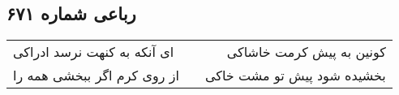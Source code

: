 \begin{center}
\section*{رباعی شماره ۶۷۱}
\label{sec:sh671}
\begin{longtable}{l p{0.5cm} r}
ای آنکه به کنهت نرسد ادراکی
&&
کونین به پیش کرمت خاشاکی
\\
از روی کرم اگر ببخشی همه را
&&
بخشیده شود پیش تو مشت خاکی
\\
\end{longtable}
\end{center}

